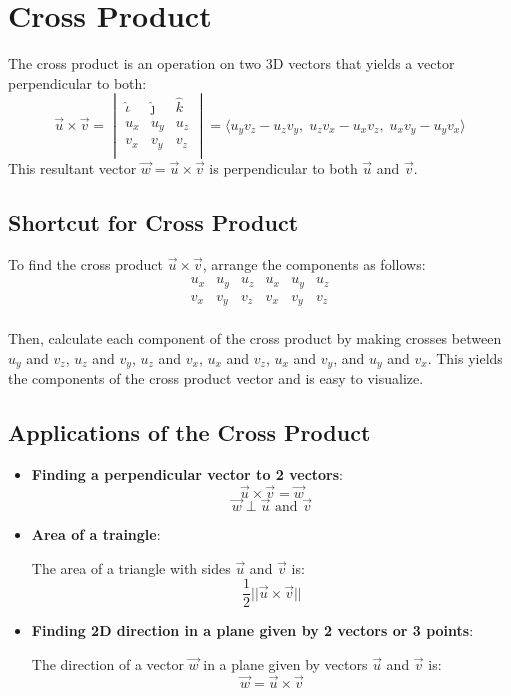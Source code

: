 \documentclass[a4paper,12pt,openany]{book}
\newcommand{\uniti}{
    \hat{\iota}
}
\newcommand{\unitj}{
    \hat{\jmath}
}
\newcommand{\unitk}{
    \hat{k}
}
\begin{document}
\section{Cross Product}
The cross product is an operation on two 3D vectors that yields a vector perpendicular to both:
\begin{equation}\label{Cross Product}
    \vec{u} \times \vec{v} = 
    \begin{vmatrix}
        \uniti & \unitj & \unitk \\
        u_x & u_y & u_z \\
        v_x & v_y & v_z \\
    \end{vmatrix} 
    = \langle u_y v_z - u_z v_y, \; u_z v_x - u_x v_z, \; u_x v_y - u_y v_x \rangle
\end{equation}
This resultant vector \(\vec{w} = \vec{u} \times \vec{v}\) is perpendicular to both \(\vec{u}\) and \(\vec{v}\).
\subsection{Shortcut for Cross Product}

To find the cross product \(\vec{u} \times \vec{v}\), arrange the components as follows:
\[
\begin{array}{|cccccc|}
    u_x & u_y & u_z & u_x & u_y & u_z \\
    v_x & v_y & v_z & v_x & v_y & v_z \\
\end{array}
\]

Then, calculate each component of the cross product by making crosses between $u_y$ and $v_z$, $u_z$ and $v_y$, $u_z$ and $v_x$, $u_x$ and $v_z$, $u_x$ and $v_y$, and $u_y$ and $v_x$. This yields the components of the cross product vector and is easy to visualize.
\subsection{Applications of the Cross Product}
\begin{itemize}
    \item \textbf{Finding a perpendicular vector to 2 vectors}:
    \[
        \vec{u} \times \vec{v} = \vec{w}
    \]
    \[
        \vec{w} \perp \vec{u} \text{ and } \vec{v} 
    \]
    \item \textbf{Area of a traingle}:
    
    The area of a triangle with sides \(\vec{u}\) and \(\vec{v}\) is:
    \[
        \dfrac{1}{2} ||\vec{u} \times \vec{v}||
    \]
    \item \textbf{Finding 2D direction in a plane given by 2 vectors or 3 points}:
    
    The direction of a vector \(\vec{w}\) in a plane given by vectors \(\vec{u}\) and \(\vec{v}\) is:
    \[
        \vec{w} = \vec{u} \times \vec{v}
    \]
\end{itemize}
\end{document}
